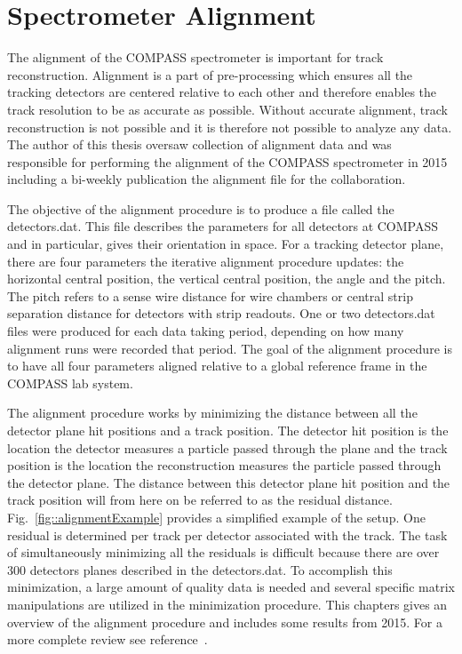 \chapter{Spectrometer Alignment} \label{ch::alignment}
\ifpdf
\graphicspath{{Chapters/Alignment/Figs/}}
\fi

The alignment of the COMPASS spectrometer is important for track reconstruction.
Alignment is a part of pre-processing which ensures all the tracking detectors
are centered relative to each other and therefore enables the track resolution
to be as accurate as possible.  Without accurate alignment, track reconstruction
is not possible and it is therefore not possible to analyze any data.  The
author of this thesis oversaw collection of alignment data and was responsible
for performing the alignment of the COMPASS spectrometer in 2015 including a
bi-weekly publication the alignment file for the collaboration.

The objective of the alignment procedure is to produce a file called the
detectors.dat.  This file describes the parameters for all detectors at COMPASS
and in particular, gives their orientation in space.  For a tracking detector
plane, there are four parameters the iterative alignment procedure updates: the
horizontal central position, the vertical central position, the angle and the
pitch.  The pitch refers to a sense wire distance for wire chambers or central
strip separation distance for detectors with strip readouts.  One or two
detectors.dat files were produced for each data taking period, depending on how
many alignment runs were recorded that period.  The goal of the alignment
procedure is to have all four parameters aligned relative to a global reference
frame in the COMPASS lab system.

The alignment procedure works by minimizing the distance between all the
detector plane hit positions and a track position.  The detector hit position is
the location the detector measures a particle passed through the plane and the
track position is the location the reconstruction measures the particle passed
through the detector plane.  The distance between this detector plane hit
position and the track position will from here on be referred to as the residual
distance.  Fig.~\ref{fig::alignmentExample} provides a simplified example of
the setup.  One residual is determined per track per detector associated
with the track.  The task of simultaneously minimizing all the residuals is
difficult because there are over 300 detectors planes described in the
detectors.dat.  To accomplish this minimization, a large amount of quality data
is needed and several specific matrix manipulations are utilized in the
minimization procedure.  This chapters gives an overview of the alignment
procedure and includes some results from 2015.  For a more complete review see
reference~\cite{compassAlignmentNote}.

